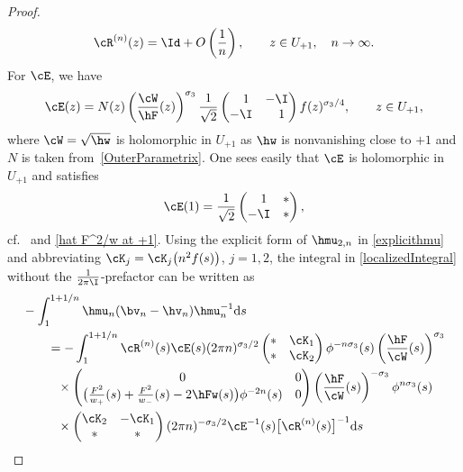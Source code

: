 \begin{proof}
\begin{align*}
\cR^{(n)}(z) = \Id + O\left(\frac{1}{n} \right), \qquad z \in U_{+1},\quad n \to \infty.
\end{align*}
For $\cE$, we have
\begin{align*}
 \cE(z) = N(z)\left(\frac{ \cW}{\hF}(z)\right)^{\sigma_3}\frac{1}{\sqrt{2}}
 \begin{pmatrix}
 \phantom{-} 1 & -\I
 \\
 -\I & \phantom{-} 1
 \end{pmatrix}f(z)^{\sigma_3/4}, \qquad z \in U_{+1},
\end{align*}
where $\cW = \sqrt{\hw}$ is holomorphic in $U_{+1}$ as $\hw$ is nonvanishing close to $+1$ and $N$ is taken from~\eqref{OuterParametrix}. One sees easily that $\cE$ is holomorphic in $U_{+1}$ and satisfies
\begin{align*}
 \cE(1) = \frac{1}{\sqrt{2}}
 \begin{pmatrix}
 \phantom{-} 1 & *
 \\
 -\I & *
 \end{pmatrix},
\end{align*}
cf.\ \cite[Proposition~C.2]{CD} and \eqref{hat F^2/w at +1}. Using the explicit form of $\hmu_{2,n}$ in \eqref{explicithmu} and abbreviating $\cK_j = \cK_j\big(n^2 f(s)\big)$, $j = 1,2$, the integral in \eqref{localizedIntegral} without the $\frac{1}{2\pi\I}$-prefactor can be written as
\begin{align}
 &-\int_1^{1+1/n} \hmu_n(\bv_n-\hv_n)\hmu_n^{-1} {\rm d}s\nonumber
 \\
 &\qquad= -\int_1^{1+1/n} \cR^{(n)}(s)\cE(s)(2\pi n)^{\sigma_3/2}
 \begin{pmatrix}
 * & \cK_1
 \\
 * & \cK_2
 \end{pmatrix}
 \phi^{-n\sigma_3}(s)\left(\frac{\hF}{\cW}(s)\right)^{\sigma_3}\nonumber
 \\
 &\phantom{\qquad=}{}\times \begin{pmatrix}
 0 & 0
 \\
 \big(\frac{F^2}{w_+}(s)+\frac{F^2}{w_-}(s)-2\hFw(s)\big) \phi^{-2n}(s) & 0
 \end{pmatrix}
 \left(\frac{\hF}{\cW}(s)\right)^{-\sigma_3}\phi^{n\sigma_3}(s)\nonumber
 \\
 &\phantom{\qquad=}{}\times \begin{pmatrix}
 \cK_2 & -\cK_1
 \\
 * & *
 \end{pmatrix}(2\pi n)^{-\sigma_3/2}\cE^{-1}(s) \big[\cR^{(n)}(s)\big]^{-1} {\rm d}s\nonumber

\end{align}
\end{proof}
